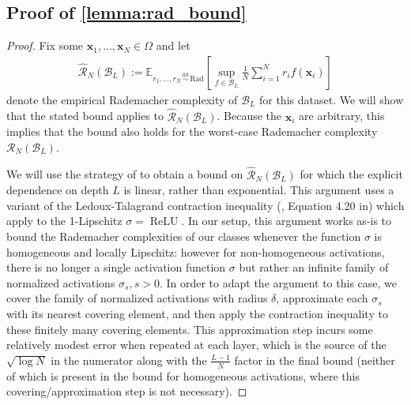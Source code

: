\documentclass{article}
\DeclareMathOperator{\ReLU}{\mathrm{ReLU}}
\def\vx{{\bm{x}}}
\def\cB{{\mathcal{B}}}
\def\cR{{\mathcal{R}}}
\def\bE{{\mathbb{E}}}
\begin{document}
\begin{appendices}
\subsection{Proof of \cref{lemma:rad_bound}} \label{appendix:proof_rad_bound}
\begin{proof}
    Fix some $\vx_1, \dots, \vx_N \in \Omega$ and let
    \begin{align}
        \widehat{\cR}_N(\cB_L) := \bE_{r_1, \dots, r_N \, \overset{\mathrm{iid}}{\sim} \, \mathrm{Rad}}  \left[ \sup_{f \in \cB_L} \frac{1}{N}  \sum_{i=1}^N r_i f(\vx_i) \right]
    \end{align}
    denote the empirical Rademacher complexity of $\cB_L$ for this dataset. We will show that the stated bound applies to $\widehat{\cR}_N(\cB_L)$. Because the $\vx_i$ are arbitrary, this implies that the bound also holds for the worst-case Rademacher complexity $\cR_N(\cB_L)$.

    We will use the strategy of \cite{golowich2018size} to obtain a bound on $\widehat{\cR}_N(\cB_L)$ for which the explicit dependence on depth $L$ is linear, rather than exponential. This argument uses a variant of the Ledoux-Talagrand contraction inequality (\cite{ledoux1991probability}, Equation 4.20 in) which \cite{golowich2018size} apply to the 1-Lipschitz $\sigma = \ReLU$. In our setup, this argument works as-is to bound the Rademacher complexities of our classes whenever the function $\sigma$ is homogeneous and locally Lipschitz: however for non-homogeneous activations, there is no longer a single activation function $\sigma$ but rather an infinite family of normalized activations $\sigma_s, s > 0$. In order to adapt the argument to this case, we cover the family of normalized activations with radius $\delta$, approximate each $\sigma_s$ with its nearest covering element, and then apply the contraction inequality to these finitely many covering elements. This approximation step incurs some relatively modest error when repeated at each layer, which is the source of the $\sqrt{\log N}$ in the numerator along with the $\frac{L-1}{N}$ factor in the final bound (neither of which is present in the bound for homogeneous activations, where this covering/approximation step is not necessary). 

\end{proof}
\end{appendices}
\end{document}
